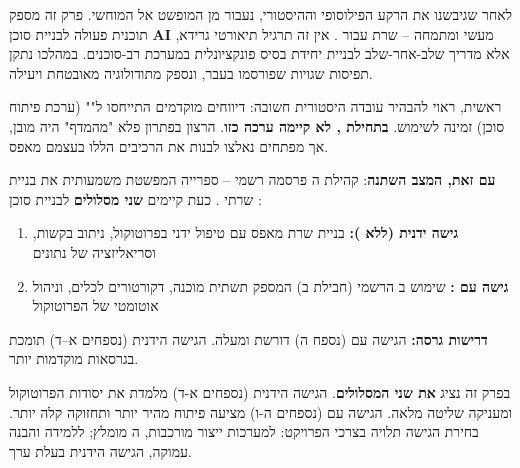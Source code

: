 
לאחר שגיבשנו את הרקע הפילוסופי וההיסטורי, נעבור מן המופשט אל המוחשי. פרק זה מספק תוכנית פעולה לבניית סוכן \textbf{AI} מעשי ומתמחה – שרת  עבור . אין זה תרגיל תיאורטי גרידא, אלא מדריך שלב-אחר-שלב לבניית יחידת בסיס פונקציונלית במערכת רב-סוכנים. במהלכו נתקן תפיסות שגויות שפורסמו בעבר, ונספק מתודולוגיה מאובטחת ויעילה.


ראשית, ראוי להבהיר עובדה היסטורית חשובה: דיווחים מוקדמים התייחסו ל"" (ערכת פיתוח סוכן) זמינה לשימוש. \textbf{בתחילת , לא קיימה ערכה כזו}. הרצון בפתרון פלא "מהמדף" היה מובן, אך מפתחים נאלצו לבנות את הרכיבים הללו בעצמם מאפס.

\textbf{עם זאת, המצב השתנה}: קהילת ה פרסמה  רשמי – ספרייה המפשטת משמעותית את בניית שרתי . כעת קיימים \textbf{שני מסלולים} לבניית סוכן :

\begin{enumerate}
\item \textbf{גישה ידנית (ללא ):} בניית שרת  מאפס עם טיפול ידני בפרוטוקול, ניתוב בקשות, וסריאליזציה של נתונים
\item \textbf{גישה עם :} שימוש ב הרשמי (חבילת  ב) המספק תשתית מוכנה, דקורטורים לכלים, וניהול אוטומטי של הפרוטוקול
\end{enumerate}

\textbf{דרישות גרסה:} הגישה עם  (נספח ה) דורשת  ומעלה. הגישה הידנית (נספחים א–ד) תומכת בגרסאות  מוקדמות יותר.

בפרק זה נציג \textbf{את שני המסלולים}. הגישה הידנית (נספחים א-ד) מלמדת את יסודות הפרוטוקול ומעניקה שליטה מלאה. הגישה עם  (נספחים ה-ו) מציעה פיתוח מהיר יותר ותחזוקה קלה יותר. בחירת הגישה תלויה בצרכי הפרויקט: למערכות ייצור מורכבות, ה מומלץ; ללמידה והבנה עמוקה, הגישה הידנית בעלת ערך.


